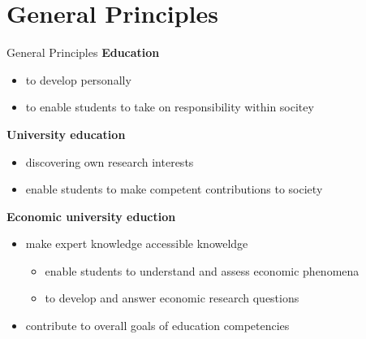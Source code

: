 \section*{General Principles}
\begin{frame}{General Principles}
	\centering
	\vspace{-4mm}
\textbf{Education}
	\begin{itemize}
		\item  to develop personally 
		\item to enable students to take on responsibility within socitey %
	\end{itemize}
\textbf{University education}
\begin{itemize}	
	\item discovering own research interests 
\item enable students to make competent contributions to society
\end{itemize}
\textbf{Economic university eduction}
\begin{itemize}
	\item make expert knowledge accessible \ar knoweldge 
	\begin{itemize}
		\item enable students to understand and assess economic phenomena %
		\item to develop and answer economic research questions
	\end{itemize}
\item contribute to overall goals of education \ar competencies
\end{itemize}
\end{frame}


